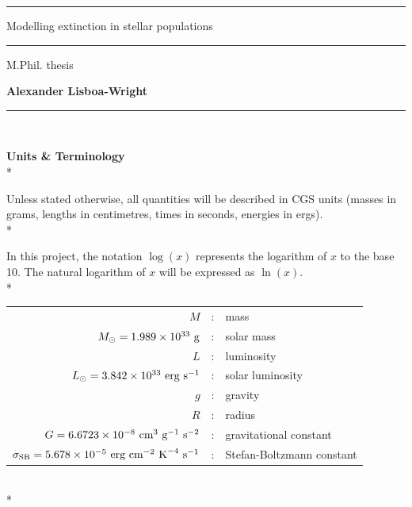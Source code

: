 \documentclass[12pt, a4paper]{report}
\begin{document}
\begin{titlepage}

\vspace*{-0.4cm}

\begin{center}
\hrule
\vspace*{0.5cm}
{\Huge \sc Modelling extinction in stellar populations \par}
\vspace*{0.5cm}
\hrule

\vspace*{5mm}
{\normalsize M.Phil. thesis}

\vfill

{\bf Alexander Lisboa-Wright}

\end{center}

\vspace*{1.0cm}

\hrule
\vspace*{0.2cm}
\\

\end{titlepage}

\begin{abstract}
\end{abstract}

\textbf{Units \& Terminology}\\*

Unless stated otherwise, all quantities will be described in CGS units (masses in grams, lengths in centimetres, times in seconds, energies in ergs). \\*

In this project, the notation $\log(x)$ represents the logarithm of $x$ to the base 10. The natural logarithm of $x$ will be expressed as $\ln(x)$. \\*

\begin{tabular}{r@{ }c@{ }l}
$M$ &:& mass\\
$M_{\odot} = 1.989 \times 10^{33} \textnormal{ g}$ &:& solar mass\\
$L$ &:& luminosity\\
$L_{\odot} = 3.842 \times 10^{33} \textnormal{ erg s}^{-1}$ &:& solar luminosity\\
$g$ &:& gravity\\
$R$ &:& radius\\
$G = 6.6723 \times 10^{-8} \textnormal{ cm}^{3} \textnormal{ g}^{-1} \textnormal{ s}^{-2}$ &:& gravitational constant\\
$\sigma_{\textnormal{SB}} = 5.678 \times 10^{-5} \textnormal{ erg cm}^{-2} \textnormal{ K}^{-4} \textnormal{ s}^{-1}$ & : & Stefan-Boltzmann constant\\
\end{tabular}
\\*
\end{document}
